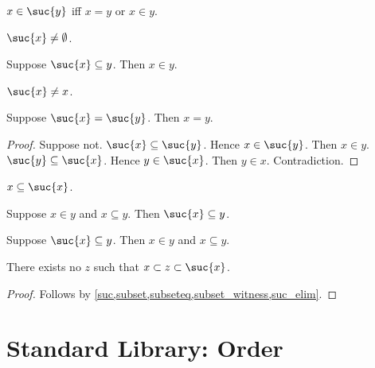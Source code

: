 \begin{proposition}\label{suc_iff}
    $x\in\suc{y}$ iff $x = y$ or $x\in y$.
\end{proposition}

\begin{proposition}\label{suc_neq_emptyset}
    $\suc{x}\neq \emptyset$.
\end{proposition}

\begin{proposition}\label{suc_subseteq_implies_in}
    Suppose $\suc{x}\subseteq y$. Then $x\in y$.
\end{proposition}

\begin{proposition}\label{suc_neq_self}
    $\suc{x}\neq x$.
\end{proposition}

\begin{proposition}\label{suc_injective}
    Suppose $\suc{x} = \suc{y}$. Then $x = y$.
\end{proposition}
\begin{proof}
    Suppose not.
    $\suc{x}\subseteq \suc{y}$. Hence $x\in\suc{y}$.
    Then $x\in y$.
    $\suc{y}\subseteq \suc{x}$. Hence $y\in\suc{x}$.
    Then $y\in x$.
    Contradiction.
\end{proof}

\begin{proposition}\label{subseteq_self_suc_intro}
    $x\subseteq\suc{x}$.
\end{proposition}

\begin{proposition}\label{suc_subseteq_intro}
    Suppose $x\in y$ and $x\subseteq y$.
    Then $\suc{x}\subseteq y$.
\end{proposition}

\begin{proposition}\label{suc_subseteq_elim}
    Suppose $\suc{x}\subseteq y$.
    Then $x\in y$ and $x\subseteq y$.
\end{proposition}

\begin{proposition}\label{suc_next_subset}
    There exists no $z$ such that $x\subset z\subset \suc{x}$.
\end{proposition}
\begin{proof}
    Follows by \cref{suc,subset,subseteq,subset_witness,suc_elim}.
\end{proof}

\section{Standard Library: Order}


